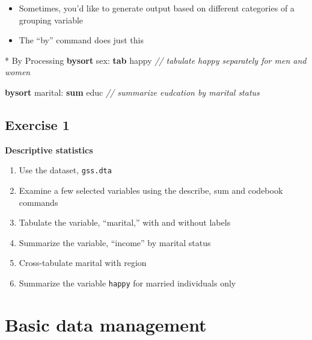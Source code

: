 \documentclass[
]{book}
\newenvironment{Shaded}{\begin{snugshade}}{\end{snugshade}}
\newcommand{\CommentTok}[1]{\textcolor[rgb]{0.56,0.35,0.01}{\textit{#1}}}
\newcommand{\KeywordTok}[1]{\textcolor[rgb]{0.13,0.29,0.53}{\textbf{#1}}}
\newcommand{\NormalTok}[1]{#1}
\providecommand{\tightlist}{%
  \setlength{\itemsep}{0pt}\setlength{\parskip}{0pt}}
\begin{document}
\begin{itemize}
\tightlist
\item
  Sometimes, you'd like to generate output based on different categories of a grouping variable
\item
  The ``by'' command does just this
\end{itemize}

\begin{Shaded}
\begin{Highlighting}[]
\NormalTok{* By Processing}
\KeywordTok{bysort}\NormalTok{ sex: }\KeywordTok{tab}\NormalTok{ happy }\CommentTok{// tabulate happy separately for men and women}
\end{Highlighting}
\end{Shaded}

\begin{Shaded}
\begin{Highlighting}[]
\KeywordTok{bysort}\NormalTok{ marital: }\KeywordTok{sum}\NormalTok{ educ }\CommentTok{// summarize eudcation by marital status}
\end{Highlighting}
\end{Shaded}

\hypertarget{exercise-1-6}{%
\subsection{Exercise 1}\label{exercise-1-6}}

\textbf{Descriptive statistics}

\begin{enumerate}
\def\labelenumi{\arabic{enumi}.}
\tightlist
\item
  Use the dataset, \texttt{gss.dta}
\item
  Examine a few selected variables using the describe, sum and codebook commands
\item
  Tabulate the variable, ``marital,'' with and without labels
\item
  Summarize the variable, ``income'' by marital status
\item
  Cross-tabulate marital with region
\item
  Summarize the variable \texttt{happy} for married individuals only
\end{enumerate}

\hypertarget{basic-data-management}{%
\section{Basic data management}\label{basic-data-management}}
\end{document}

